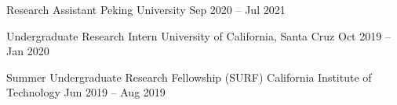 


\begin{cventries}

    
    \cvsimpentry
    {Research Assistant} %
    {Peking University} %
    {Sep 2020 -- Jul 2021} %
    {}
    
    \cvsimpentry
    {Undergraduate Research Intern} %
    {University of California, Santa Cruz} %
    {Oct 2019 -- Jan 2020} %
    {}

    
    \cvsimpentry
    {Summer Undergraduate Research Fellowship (SURF)} %
    {California Institute of Technology} %
    {Jun 2019 -- Aug 2019} %
    {}


\end{cventries}
